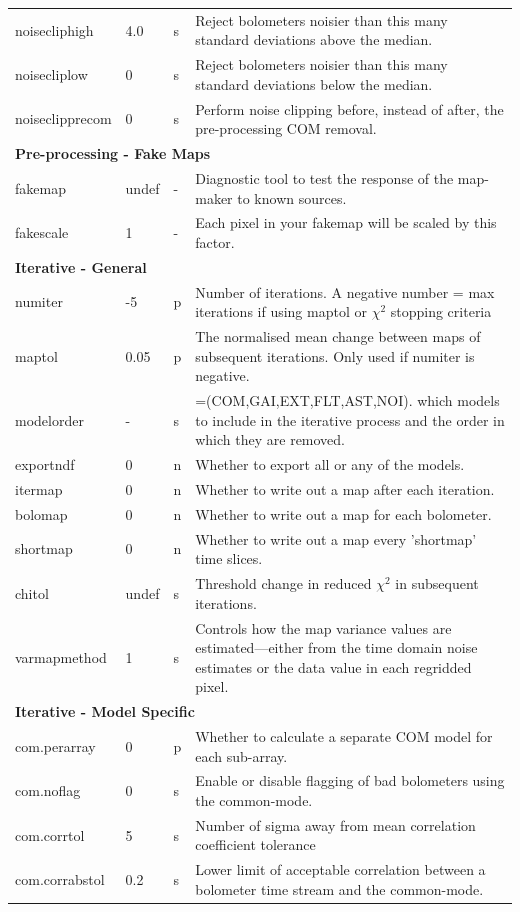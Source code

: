 \documentclass[twoside,11pt]{article}
\renewcommand{\_}{\texttt{\symbol{95}}}
\begin{document}
\begin{htmlonly}
\begin{table}
\begin{center}
\begin{footnotesize}
\begin{tabular}{|p{2.1cm}|p{0.8cm}|p{0.2cm}|p{11.2cm}|}
 noisecliphigh & 4.0 &s &Reject bolometers noisier than this many standard deviations above the median.\\
 noisecliplow & 0 &s& Reject bolometers noisier than this many standard deviations below the median.\\
 noiseclipprecom & 0 &s &Perform noise clipping before, instead of after, the pre-processing COM removal.\\
\hline
\multicolumn{4}{|l|}{\textbf{Pre-processing - Fake Maps}}\\
\hline
fakemap & undef&- &Diagnostic tool to test the response of the map-maker to known sources.  \\
fakescale & 1 &- &Each pixel in your fakemap will be scaled by this factor. \\
\hline
\multicolumn{4}{|l|}{\textbf{Iterative - General}}\\
\hline
numiter & -5 &p& Number of iterations. A negative number = max iterations if using maptol or $\chi^2$ stopping criteria\\
maptol & 0.05 &p &The normalised mean change between maps of subsequent iterations. Only used if numiter is negative.\\
modelorder & - &s& =(COM,GAI,EXT,FLT,AST,NOI). which models to include in the iterative process and the order in which they are removed. \\
exportndf & 0 &n& Whether to export all or any of the models. \\
itermap & 0 &n& Whether to write out a map after each iteration.\\
bolomap & 0 &n& Whether to write out a map for each bolometer.\\
shortmap & 0 &n& Whether to write out a map every 'shortmap' time slices.\\
chitol & undef &s& Threshold change in reduced $\chi^2$ in subsequent  iterations.\\
varmapmethod & 1 &s& Controls how the map variance values are estimated---either from the time domain noise estimates or the data value in each regridded pixel.\\
\hline
\multicolumn{4}{|l|}{\textbf{Iterative - Model Specific}}\\
\hline
com.perarray & 0 &p &Whether to calculate a separate COM model for each sub-array. \\
com.noflag & 0  &s& Enable or disable flagging of bad bolometers using the common-mode.\\
com.corr\_tol & 5  &s& Number of sigma away from mean correlation coefficient tolerance\\
com.corr\_abstol  &  0.2 & s &Lower limit of acceptable correlation between a bolometer time stream and the common-mode. \\


\end{tabular}
\end{footnotesize}
\end{center}
\end{table}
\end{htmlonly}
\end{document}
